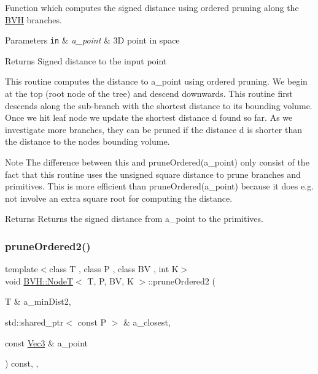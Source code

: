 Function which computes the signed distance using ordered pruning along the \hyperlink{namespaceBVH}{B\+VH} branches. 


\begin{DoxyParams}[1]{Parameters}
\mbox{\tt in}  & {\em a\+\_\+point} & 3D point in space \\
\hline
\end{DoxyParams}
\begin{DoxyReturn}{Returns}
Signed distance to the input point
\end{DoxyReturn}
This routine computes the distance to a\+\_\+point using ordered pruning. We begin at the top (root node of the tree) and descend downwards. This routine first descends along the sub-\/branch with the shortest distance to its bounding volume. Once we hit leaf node we update the shortest distance \textquotesingle{}d\textquotesingle{} found so far. As we investigate more branches, they can be pruned if the distance \textquotesingle{}d\textquotesingle{} is shorter than the distance to the node\textquotesingle{}s bounding volume. \begin{DoxyNote}{Note}
The difference between this and prune\+Ordered(a\+\_\+point) only consist of the fact that this routine uses the unsigned square distance to prune branches and primitives. This is more efficient than prune\+Ordered(a\+\_\+point) because it does e.\+g. not involve an extra square root for computing the distance. 
\end{DoxyNote}
\begin{DoxyReturn}{Returns}
Returns the signed distance from a\+\_\+point to the primitives. 
\end{DoxyReturn}
\mbox{\label{classBVH_1_1NodeT_a2887ad51251739359602dde8db6a5998}} 
\subsubsection{\texorpdfstring{prune\+Ordered2()}{pruneOrdered2()}\hspace{0.1cm}{\footnotesize\ttfamily [2/2]}}
{\footnotesize\ttfamily template$<$class T , class P , class BV , int K$>$ \\
void \hyperlink{classBVH_1_1NodeT}{B\+V\+H\+::\+NodeT}$<$ T, P, BV, K $>$\+::prune\+Ordered2 (\begin{DoxyParamCaption}\item[{T \&}]{a\+\_\+min\+Dist2,  }\item[{std\+::shared\+\_\+ptr$<$ const P $>$ \&}]{a\+\_\+closest,  }\item[{const \hyperlink{classBVH_1_1NodeT_a6fbb4308c5c55ee170c5f992df7ae1d0}{Vec3} \&}]{a\+\_\+point }\end{DoxyParamCaption}) const\hspace{0.3cm}{\ttfamily [inline]}, {\ttfamily [protected]}, {\ttfamily [noexcept]}}



